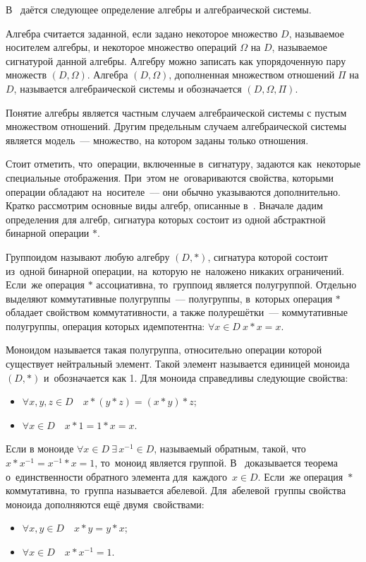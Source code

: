 В~\cite{Bauman_DM, Adelson_Velskiy} даётся следующее определение алгебры и алгебраической системы.
\begin{mydef}
Алгебра считается заданной, если задано некоторое множество $D$, называемое носителем алгебры, и некоторое множество операций $\Omega $ на $D$, называемое сигнатурой данной алгебры. Алгебру можно записать как упорядоченную пару множеств $\left( D,\Omega  \right)$. Алгебра $\left(D, \Omega \right)$, дополненная множеством отношений $\Pi$ на $D$, называется алгебраической системы и обозначается $\left(D, \Omega, \Pi \right)$.
\end{mydef}
Понятие алгебры является частным случаем алгебраической системы с пустым множеством отношений. Другим предельным случаем алгебраической системы является модель~--- множество, на котором заданы только отношения.

Стоит отметить, что~операции, включенные в~сигнатуру, задаются как~некоторые специальные отображения. При~этом не~оговариваются свойства, которыми операции обладают на~носителе~--– они обычно указываются дополнительно.
Кратко рассмотрим основные виды алгебр, описанные в~\cite{Bauman_DM, Adelson_Velskiy, Voevodin}. Вначале дадим определения для алгебр, сигнатура которых состоит из одной абстрактной бинарной операции $*$.

Группоидом называют любую алгебру $\left( D,* \right)$, сигнатура которой состоит из~одной бинарной операции, на~которую не~наложено никаких ограничений. Если~же операция $*$ ассоциативна, то~группоид является полугруппой. Отдельно выделяют коммутативные полугруппы~--– полугруппы, в~которых операция $*$ обладает свойством коммутативности, а также полурешётки~--- коммутативные полугруппы, операция которых идемпотентна: $\forall x \in D \ x*x=x$.

Моноидом называется такая полугруппа, относительно операции которой существует нейтральный элемент. Такой элемент называется единицей моноида $\left( D,* \right)$ и~обозначается как 1. Для моноида справедливы следующие свойства:
\begin{itemize}
	\item $\forall x,y,z\in D\quad x*\left( y*z \right)=\left( x*y \right)*z$;
	\item $\forall x\in D\quad x*1=1*x=x$.
\end{itemize}

Если в моноиде $\forall x\in D\ \exists \,x^{-1}\in D$, называемый обратным, такой, что~$x*{{x}^{-1}}={{x}^{-1}}*x=1$, то~моноид является группой. В~\cite{Bauman_DM, Adelson_Velskiy, Voevodin} доказывается теорема о~единственности обратного элемента для~каждого~$x\in D$. Если~же операция~$*$ коммутативна, то~группа называется абелевой. Для~абелевой~группы свойства моноида дополняются ещё двумя~свойствами:
\begin{itemize}
	\item $\forall x,y\in D\quad x*y=y*x$;
	\item $\forall x\in D\quad x*{{x}^{-1}}=1$.
\end{itemize}

